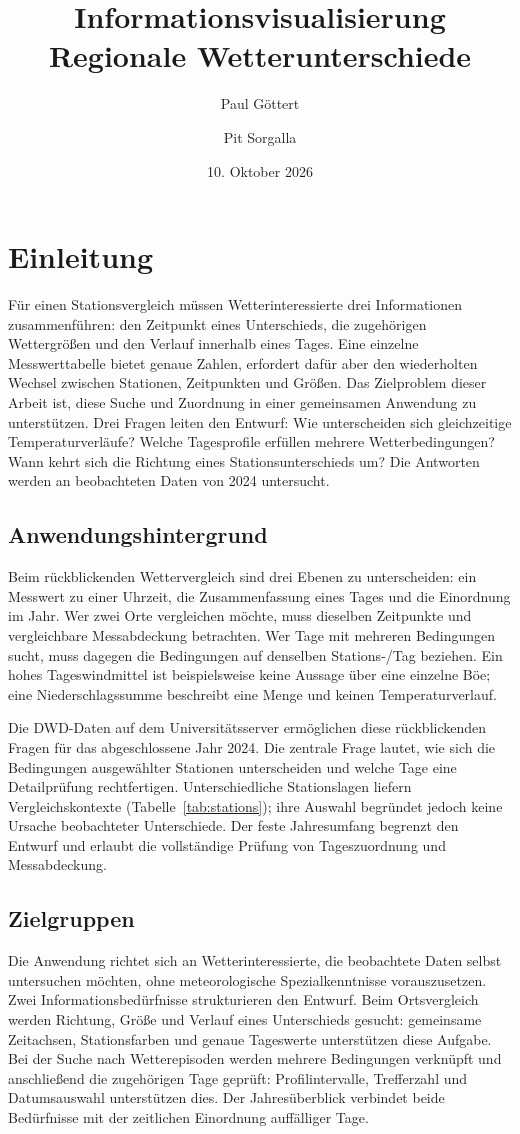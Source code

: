 \documentclass[usegeometry=true]{scrartcl}
\title{Informationsvisualisierung\\\large Regionale Wetterunterschiede}
\author{Paul Göttert \and Pit Sorgalla}
\date{10. Oktober 2026}
\begin{document}
\maketitle
\tableofcontents
\newpage

\section{Einleitung}
Für einen Stationsvergleich müssen Wetterinteressierte drei Informationen
zusammenführen: den Zeitpunkt eines Unterschieds, die zugehörigen
Wettergrößen und den Verlauf innerhalb eines Tages. Eine einzelne
Messwerttabelle bietet genaue Zahlen, erfordert dafür aber den wiederholten
Wechsel zwischen Stationen, Zeitpunkten und Größen. Das Zielproblem dieser
Arbeit ist, diese Suche und Zuordnung in einer gemeinsamen Anwendung zu
unterstützen. Drei Fragen leiten den Entwurf: Wie unterscheiden sich
gleichzeitige Temperaturverläufe? Welche Tagesprofile erfüllen mehrere
Wetterbedingungen? Wann kehrt sich die Richtung eines Stationsunterschieds
um? Die Antworten werden an beobachteten Daten von 2024 untersucht.
\subsection{Anwendungshintergrund}
Beim rückblickenden Wettervergleich sind drei Ebenen zu unterscheiden:
ein Messwert zu einer Uhrzeit, die Zusammenfassung eines Tages und die
Einordnung im Jahr. Wer zwei Orte vergleichen möchte, muss dieselben
Zeitpunkte und vergleichbare Messabdeckung betrachten. Wer Tage mit
mehreren Bedingungen sucht, muss dagegen die Bedingungen auf denselben
Stations-/Tag beziehen. Ein hohes Tageswindmittel ist beispielsweise
keine Aussage über eine einzelne Böe; eine Niederschlagssumme beschreibt
eine Menge und keinen Temperaturverlauf.

Die DWD-Daten auf dem Universitätsserver ermöglichen diese rückblickenden
Fragen für das abgeschlossene Jahr 2024. Die zentrale Frage lautet,
wie sich die Bedingungen ausgewählter Stationen unterscheiden und welche
Tage eine Detailprüfung rechtfertigen. Unterschiedliche Stationslagen
liefern Vergleichskontexte (Tabelle~\ref{tab:stations}); ihre Auswahl
begründet jedoch keine Ursache beobachteter Unterschiede.
Der feste Jahresumfang begrenzt den Entwurf und erlaubt die vollständige
Prüfung von Tageszuordnung und Messabdeckung.

\subsection{Zielgruppen}
Die Anwendung richtet sich an Wetterinteressierte, die beobachtete
Daten selbst untersuchen möchten, ohne meteorologische Spezialkenntnisse
vorauszusetzen. Zwei Informationsbedürfnisse strukturieren den Entwurf.
Beim Ortsvergleich werden Richtung, Größe und Verlauf eines Unterschieds
gesucht: gemeinsame Zeitachsen, Stationsfarben und genaue Tageswerte
unterstützen diese Aufgabe. Bei der Suche nach Wetterepisoden werden
mehrere Bedingungen verknüpft und anschließend die zugehörigen Tage
geprüft: Profilintervalle, Trefferzahl und Datumsauswahl unterstützen dies.
Der Jahresüberblick verbindet beide Bedürfnisse mit der zeitlichen
Einordnung auffälliger Tage.
\end{document}
